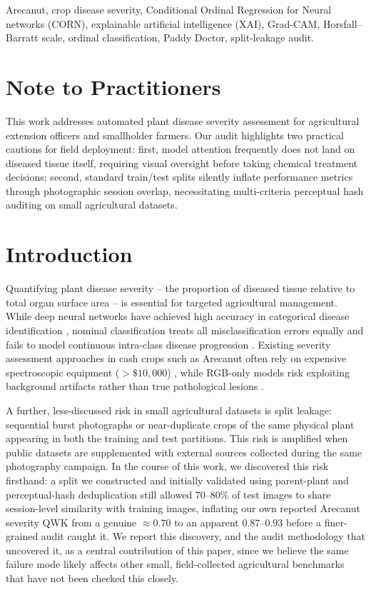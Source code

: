 \documentclass[conference]{IEEEtran}
\begin{document}
\begin{IEEEkeywords}
Arecanut, crop disease severity, Conditional Ordinal Regression for Neural networks (CORN), explainable artificial intelligence (XAI), Grad-CAM, Horsfall--Barratt scale, ordinal classification, Paddy Doctor, split-leakage audit.
\end{IEEEkeywords}

\section*{Note to Practitioners}
This work addresses automated plant disease severity assessment for agricultural extension officers and smallholder farmers. Our audit highlights two practical cautions for field deployment: first, model attention frequently does not land on diseased tissue itself, requiring visual oversight before taking chemical treatment decisions; second, standard train/test splits silently inflate performance metrics through photographic session overlap, necessitating multi-criteria perceptual hash auditing on small agricultural datasets.

\section{Introduction}
Quantifying plant disease severity -- the proportion of diseased tissue relative to total organ surface area -- is essential for targeted agricultural management. While deep neural networks have achieved high accuracy in categorical disease identification \cite{petchiammal2023paddy, mohanty2016using, ferentinos2018deep}, nominal classification treats all misclassification errors equally and fails to model continuous intra-class disease progression \cite{horsfall1945fungicides, bock2022plant}. Existing severity assessment approaches in cash crops such as Arecanut often rely on expensive spectroscopic equipment ($>\$10{,}000$) \cite{kushalatha2024spectroscopy}, while RGB-only models risk exploiting background artifacts rather than true pathological lesions \cite{selvaraju2017grad}.

A further, less-discussed risk in small agricultural datasets is split leakage: sequential burst photographs or near-duplicate crops of the same physical plant appearing in both the training and test partitions. This risk is amplified when public datasets are supplemented with external sources collected during the same photography campaign. In the course of this work, we discovered this risk firsthand: a split we constructed and initially validated using parent-plant and perceptual-hash deduplication still allowed 70--80\% of test images to share session-level similarity with training images, inflating our own reported Arecanut severity QWK from a genuine $\approx 0.70$ to an apparent $0.87$--$0.93$ before a finer-grained audit caught it. We report this discovery, and the audit methodology that uncovered it, as a central contribution of this paper, since we believe the same failure mode likely affects other small, field-collected agricultural benchmarks that have not been checked this closely.
\end{document}
